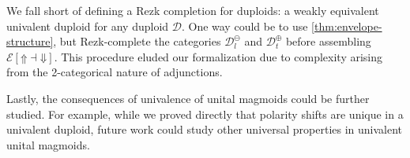 \documentclass[runningheads]{llncs}
\newcommand{\acat}[1]{\mathcal{#1}}
\newcommand{\D}{\acat{D}}
\newcommand{\EE}{\acat{E}}
\newcommand{\Cl}[1]{#1_l}
\newcommand{\Ct}[1]{#1_t}
\newcommand{\Cn}[1]{#1^\ominus}
\newcommand{\Cp}[1]{#1^\oplus}
\newcommand{\Cnl}[1]{\Cn{\Cl{#1}}}
\newcommand{\Cpt}[1]{\Cp{\Ct{#1}}}
\newcommand{\Env}[1]{\EE[#1]}
\newcommand{\upshift}{\mathord{\Uparrow}}
\newcommand{\downshift}{\mathord{\Downarrow}}
\begin{document}
We fall short of defining a Rezk completion for duploids: a weakly
equivalent univalent duploid for any duploid \(\D\). One way could be
to use \autoref{thm:envelope-structure}, but Rezk\hyp{}complete the categories
\(\Cnl\D\) and \(\Cpt\D\) before assembling \(\Env{\upshift \dashv
\downshift}\). This procedure eluded our formalization due to
complexity arising from the 2-categorical nature of
adjunctions.

Lastly, the consequences of univalence of unital magmoids could be
further studied. For example, while we proved directly that polarity
shifts are unique in a univalent duploid, future work could study
other universal properties in univalent unital magmoids.


\label{lastpage}
\end{document}
